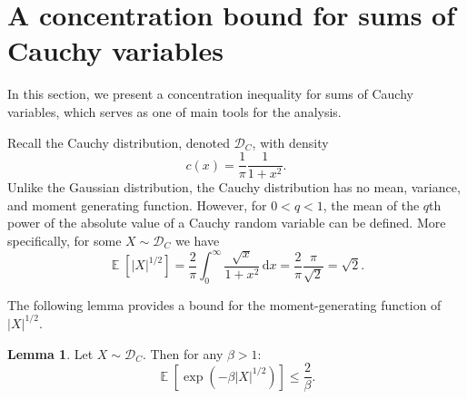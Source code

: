 \documentclass[10pt,a4paper,twoside]{book}
\newcommand{\cauchy}{\mathcal{D}_C}
\newcommand{\dx}{\,\mathrm{d} x}
\DeclareMathOperator*{\EE}{\mathbb{E}}
\theoremstyle{definition}
\newtheorem{lemma}[definition]{Lemma}
\theoremstyle{remark}
\begin{document}
\section{A concentration bound for sums of Cauchy variables}
In this section, we present a concentration inequality for sums of Cauchy variables, which serves as one of main tools for the analysis.  

Recall the Cauchy distribution, denoted $\cauchy$, with density 
\[ c(x) = \frac{1}{\pi} \frac{1}{1+x^2}. \]
Unlike the Gaussian distribution, the Cauchy distribution has no mean, variance, and moment generating function. However, for $0 < q < 1$, the mean of the $q$th power of the absolute value of a Cauchy random variable can be defined. More specifically, for some $X \sim \cauchy$ we have
\begin{equation*} \label{exphalf}
    \EE \left[ |X|^{1/2} \right] =  \frac{2}{\pi} \int_{0}^{\infty} \frac{\sqrt{x}}{1+x^2} \dx = \frac{2}{\pi} \frac{\pi}{\sqrt{2}} = \sqrt{2}.
\end{equation*}

The following lemma provides a bound for the moment-generating function of $|X|^{1/2}$.
\begin{lemma} \label{lemma:mgf}
Let $X \sim \cauchy$. Then for any $\beta > 1$:
\begin{equation*}
    \EE \left[ \exp{(-\beta |X|^{1/2})} \right] \leq  \frac{2}{\beta}.
\end{equation*}
\end{lemma}
\end{document}
